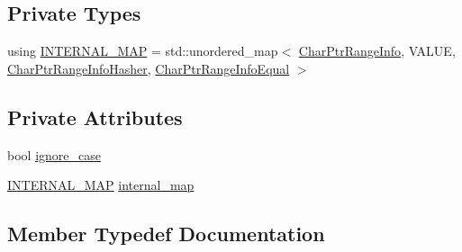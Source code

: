 \subsection*{Private Types}
\begin{DoxyCompactItemize}
\item 
using \mbox{\hyperlink{classlucene_1_1core_1_1analysis_1_1characterutil_1_1CharMap_a0fe744ab48aa6f998a3d7e159a351d69}{I\+N\+T\+E\+R\+N\+A\+L\+\_\+\+M\+AP}} = std\+::unordered\+\_\+map$<$ \mbox{\hyperlink{classlucene_1_1core_1_1analysis_1_1characterutil_1_1CharPtrRangeInfo}{Char\+Ptr\+Range\+Info}}, V\+A\+L\+UE, \mbox{\hyperlink{classlucene_1_1core_1_1analysis_1_1characterutil_1_1CharPtrRangeInfoHasher}{Char\+Ptr\+Range\+Info\+Hasher}}, \mbox{\hyperlink{classlucene_1_1core_1_1analysis_1_1characterutil_1_1CharPtrRangeInfoEqual}{Char\+Ptr\+Range\+Info\+Equal}} $>$
\end{DoxyCompactItemize}
\subsection*{Private Attributes}
\begin{DoxyCompactItemize}
\item 
bool \mbox{\hyperlink{classlucene_1_1core_1_1analysis_1_1characterutil_1_1CharMap_a1a62994159ecb2e6767c0d67238ad35c}{ignore\+\_\+case}}
\item 
\mbox{\hyperlink{classlucene_1_1core_1_1analysis_1_1characterutil_1_1CharMap_a0fe744ab48aa6f998a3d7e159a351d69}{I\+N\+T\+E\+R\+N\+A\+L\+\_\+\+M\+AP}} \mbox{\hyperlink{classlucene_1_1core_1_1analysis_1_1characterutil_1_1CharMap_aa86d94ea61970d00283d8eb72d12e1cf}{internal\+\_\+map}}
\end{DoxyCompactItemize}


\subsection{Member Typedef Documentation}
\mbox{\label{classlucene_1_1core_1_1analysis_1_1characterutil_1_1CharMap_a0fe744ab48aa6f998a3d7e159a351d69}} 

